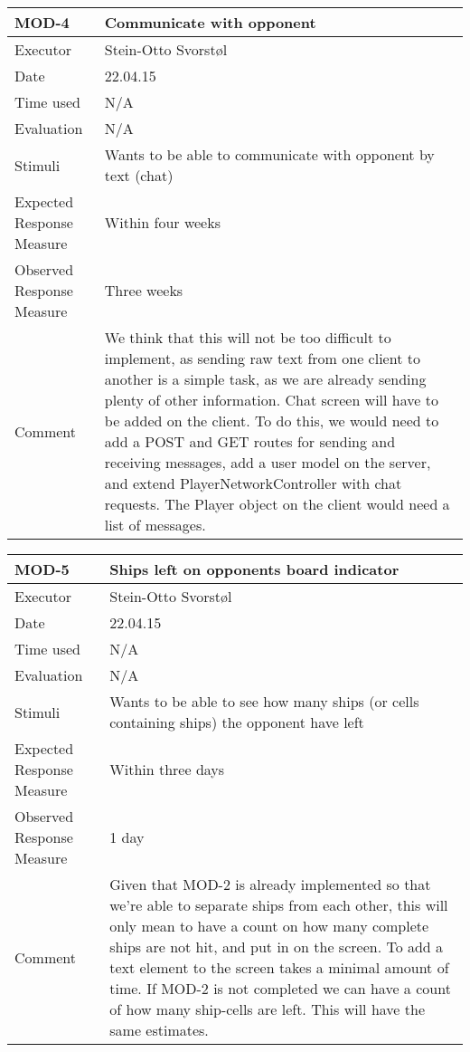 \begin{table}[H]
\begin{tabular}{|l|p{10cm}|}
\hline
\textbf{MOD-4} & Communicate with opponent \\ \hline
Executor    & Stein-Otto Svorstøl   \\ \hline
Date        & 22.04.15         \\ \hline
Time used   & N/A       \\ \hline
Evaluation  & N/A          \\ \hline
Stimuli     & Wants to be able to communicate with opponent by text (chat)        \\ \hline
Expected Response Measure &  Within four weeks     \\ \hline
Observed Response Measure &  Three weeks     \\ \hline
Comment     & We think that this will not be too difficult to implement, as sending raw text from one client to another is a simple task, as we are already sending plenty of other information. Chat screen will have to be added on the client. To do this, we would need to add a POST and GET routes for sending and receiving messages, add a user model on the server, and extend PlayerNetworkController with chat requests. The Player object on the client would need a list of messages. \\ \hline
\end{tabular}
\end{table}

\begin{table}[H]
\begin{tabular}{|l|p{10cm}|}
\hline
\textbf{MOD-5} & Ships left on opponents board indicator \\ \hline
Executor    & Stein-Otto Svorstøl         \\ \hline
Date        & 22.04.15         \\ \hline
Time used   & N/A     \\ \hline
Evaluation  & N/A        \\ \hline
Stimuli     & Wants to be able to see how many ships (or cells containing ships) the opponent have left         \\ \hline
Expected Response Measure & Within three days       \\ \hline
Observed Response Measure & 1 day   \\ \hline
Comment     & Given that MOD-2 is already implemented so that we're able to separate ships from each other, this will only mean to have a count on how many complete ships are not hit, and put in on the screen. To add a text element to the screen takes a minimal amount of time. If MOD-2 is not completed we can have a count of how many ship-cells are left. This will have the same estimates. \\ \hline
\end{tabular}
\end{table}

